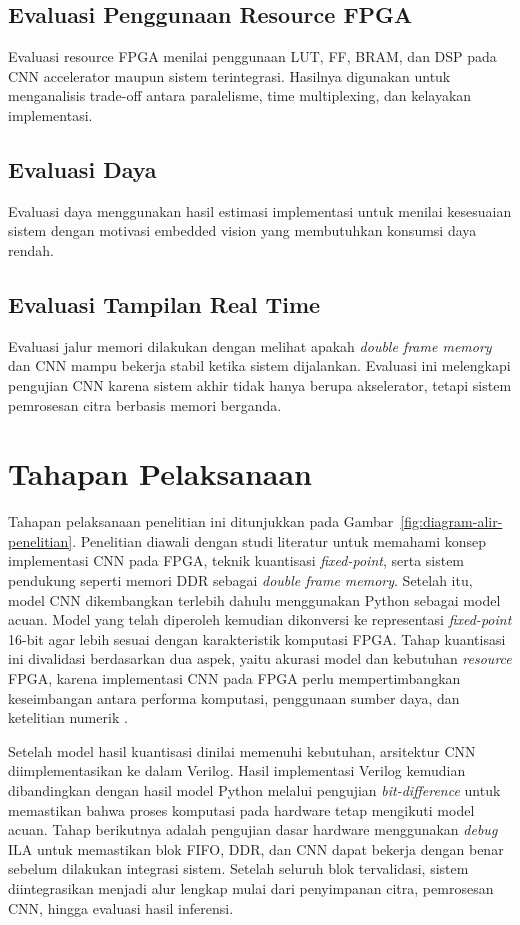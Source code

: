     \subsection{Evaluasi Penggunaan Resource FPGA}
	Evaluasi resource FPGA menilai penggunaan LUT, FF, BRAM, dan DSP pada CNN accelerator maupun sistem terintegrasi. Hasilnya digunakan untuk menganalisis trade-off antara paralelisme, time multiplexing, dan kelayakan implementasi.
    \subsection{Evaluasi Daya}
	Evaluasi daya menggunakan hasil estimasi implementasi untuk menilai kesesuaian sistem dengan motivasi embedded vision yang membutuhkan konsumsi daya rendah.
    \subsection{Evaluasi Tampilan Real Time}
		Evaluasi jalur memori dilakukan dengan melihat apakah \emph{double frame
		memory} dan CNN mampu bekerja stabil ketika sistem dijalankan. Evaluasi ini
		melengkapi pengujian CNN karena sistem akhir tidak hanya berupa akselerator,
		tetapi sistem pemrosesan citra berbasis memori berganda.

\section{Tahapan Pelaksanaan}
Tahapan pelaksanaan penelitian ini ditunjukkan pada
Gambar~\ref{fig:diagram-alir-penelitian}. Penelitian
diawali dengan studi literatur untuk memahami konsep
implementasi CNN pada
FPGA, teknik kuantisasi \emph{fixed-point}, serta
	sistem pendukung seperti memori DDR sebagai
	\emph{double frame memory}. Setelah itu, model CNN
	dikembangkan
terlebih dahulu menggunakan Python sebagai model acuan.
Model yang telah diperoleh kemudian dikonversi ke
representasi \emph{fixed-point} 16-bit agar lebih sesuai
dengan karakteristik komputasi FPGA. Tahap kuantisasi
ini divalidasi berdasarkan dua aspek, yaitu akurasi
model dan kebutuhan \emph{resource} FPGA, karena
implementasi CNN pada FPGA perlu mempertimbangkan
keseimbangan antara performa komputasi, penggunaan
sumber daya, dan ketelitian numerik
\cite{Solovyev2019FixedPointCNN, Jacob2018Quantization}.

Setelah model hasil kuantisasi dinilai memenuhi
kebutuhan, arsitektur CNN diimplementasikan ke dalam
Verilog. Hasil implementasi Verilog kemudian dibandingkan
dengan hasil model Python melalui pengujian
\emph{bit-difference} untuk memastikan bahwa proses
komputasi pada hardware tetap mengikuti model acuan.
	Tahap berikutnya adalah pengujian dasar hardware menggunakan
	\emph{debug} ILA untuk memastikan blok FIFO, DDR,
	dan CNN dapat bekerja dengan benar sebelum dilakukan
	integrasi sistem. Setelah seluruh blok tervalidasi, sistem
	diintegrasikan menjadi alur lengkap mulai dari penyimpanan
	citra, pemrosesan CNN, hingga evaluasi hasil inferensi.

